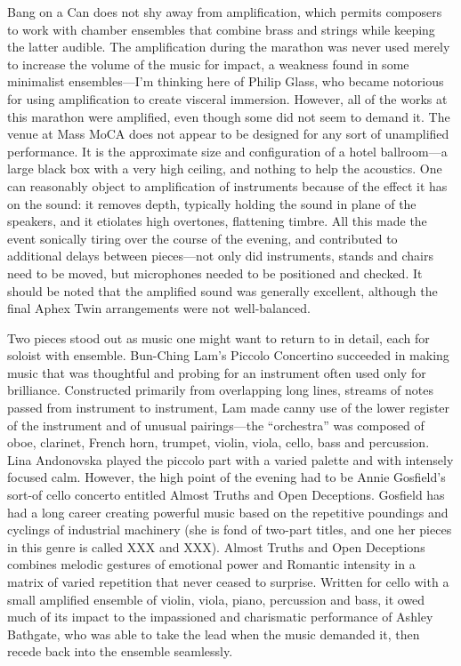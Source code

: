 Bang on a Can does not shy away from amplification, which permits composers to work with chamber ensembles that combine brass and strings while keeping the latter audible. The amplification during the marathon was never used merely to increase the volume of the music for impact, a weakness found in some minimalist ensembles—I’m thinking here of Philip Glass, who became notorious for using amplification to create visceral immersion. However, all of the works at this marathon were amplified, even though some did not seem to demand it. The venue at Mass MoCA does not appear to be designed for any sort of unamplified performance. It is the approximate size and configuration of a hotel ballroom—a large black box with a very high ceiling, and nothing to help the acoustics. One can reasonably object to amplification of instruments because of the effect it has on the sound: it removes depth, typically holding the sound in plane of the speakers, and it etiolates high overtones, flattening timbre. All this made the event sonically tiring over the course of the evening, and contributed to additional delays between pieces—not only did instruments, stands and chairs need to be moved, but microphones needed to be positioned and checked. It should be noted that the amplified sound was generally excellent, although the final Aphex Twin arrangements were not well-balanced.

Two pieces stood out as music one might want to return to in detail, each for soloist with ensemble. Bun-Ching Lam’s Piccolo Concertino succeeded in making music that was thoughtful and probing for an instrument often used only for brilliance. Constructed primarily from overlapping long lines, streams of notes passed from instrument to instrument, Lam made canny use of the lower register of the instrument and of unusual pairings—the “orchestra” was composed of oboe, clarinet, French horn, trumpet, violin, viola, cello, bass and percussion. Lina Andonovska played the piccolo part with a varied palette and with intensely focused calm. However, the high point of the evening had to be Annie Gosfield’s sort-of cello concerto entitled Almost Truths and Open Deceptions. Gosfield has had a long career creating powerful music based on the repetitive poundings and cyclings of industrial machinery (she is fond of two-part titles, and one her pieces in this genre is called XXX and XXX). Almost Truths and Open Deceptions combines melodic gestures of emotional power and Romantic intensity in a matrix of varied repetition that never ceased to surprise. Written for cello with a small amplified ensemble of violin, viola, piano, percussion and bass, it owed much of its impact to the impassioned and charismatic performance of Ashley Bathgate, who was able to take the lead when the music demanded it, then recede back into the ensemble seamlessly.

